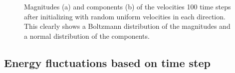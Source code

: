 \documentclass[reprint,floatfix,amsmath,amssymb,aps,pra]{revtex4-1}
\begin{document}
\begin{figure}
    \centering
     \label{fig:velocity-magnitudes-later}
     \label{fig:velocity-magnitudes-later}
    \caption{Magnitudes (a) and components (b) of the velocities 100 time steps after initializing with random uniform velocities in each direction. This clearly shows a Boltzmann distribution of the magnitudes and a normal distribution of the components.}
    \label{fig:velocity-evolution-later}
\end{figure}

\subsection{Energy fluctuations based on time step}
\end{document}
